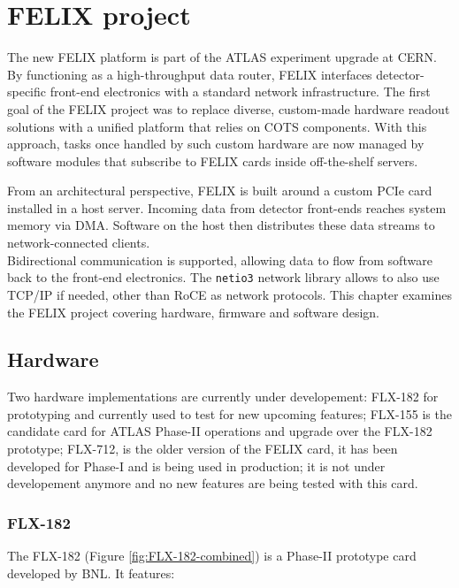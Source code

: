 \chapter{\acs{FELIX} project}

The new \acs{FELIX} platform is part of the \acs{ATLAS} experiment upgrade at \ac{CERN}. By functioning as a high-throughput data router, \acs{FELIX} interfaces detector-specific front-end electronics with a standard network infrastructure. The first goal of the \acs{FELIX} project was to replace diverse, custom-made hardware readout solutions with a unified platform that relies on \acf{COTS} components. With this approach, tasks once handled by such custom hardware are now managed by software modules that subscribe to \acs{FELIX} cards inside off-the-shelf servers.

From an architectural perspective, \acs{FELIX} is built around a custom \acs{PCIe} card installed in a host server. Incoming data from detector front-ends reaches system memory via \acf{DMA}. Software on the host then distributes these data streams to network-connected clients.\\
Bidirectional communication is supported, allowing data to flow from software back to the front-end electronics. The \texttt{netio3} network library allows to also use TCP/IP if needed, other than \acf{RoCE} as network protocols. This chapter examines the \acs{FELIX} project covering hardware, firmware and software design.

\clearpage
\section{Hardware}

Two hardware implementations are currently under developement: 
FLX-182 for prototyping and currently used to test for new upcoming features;
FLX-155 is the candidate card for \acs{ATLAS} Phase-II operations and upgrade over the FLX-182 prototype;
FLX-712, is the older version of the \acs{FELIX} card, it has been developed for Phase-I and is being used in production; it is not under developement anymore and no new features are being tested with this card.

\subsection{FLX-182}

The FLX-182 \cite{Ilic:2873569} (Figure \ref{fig:FLX-182-combined}) is a Phase-II prototype card developed by \acf{BNL}. It features:

